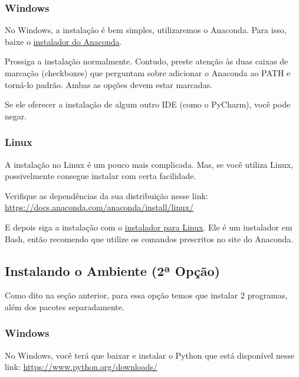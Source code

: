 \documentclass[a4paper, 11pt, brazilian]{article}
\begin{document}
\hypertarget{windows}{%
\subsubsection{Windows}\label{windows}}

No Windows, a instalação é bem simples, utilizaremos o Anaconda. Para
isso, baixe o
\href{https://www.anaconda.com/download/\#windows}{instalador do
Anaconda}.

Prossiga a instalação normalmente. Contudo, preste atenção às duas
caixas de marcação (checkboxes) que perguntam sobre adicionar o Anaconda
ao PATH e torná-lo padrão. Ambas as opções devem estar marcadas.

Se ele oferecer a instalação de algum outro IDE (como o PyCharm), você
pode negar.

\hypertarget{linux}{%
\subsubsection{Linux}\label{linux}}

A instalação no Linux é um pouco mais complicada. Mas, se você utiliza
Linux, possivelmente consegue instalar com certa facilidade.

Verifique as dependências da sua distribuição nesse link:
\url{https://docs.anaconda.com/anaconda/install/linux/}

E depois siga a instalação com o
\href{https://www.anaconda.com/download/\#linux}{instalador para Linux}.
Ele é um instalador em Bash, então recomendo que utilize os comandos
prescritos no site do Anaconda.

\hypertarget{instalando-o-ambiente-2uxaa-opuxe7uxe3o}{%
\subsection{Instalando o Ambiente (2ª
Opção)}\label{instalando-o-ambiente-2uxaa-opuxe7uxe3o}}

Como dito na seção anterior, para essa opção temos que instalar 2
programas, além dos pacotes separadamente.

\hypertarget{windows-1}{%
\subsubsection{Windows}\label{windows-1}}

No Windows, você terá que baixar e instalar o Python que está disponível
nesse link: \url{https://www.python.org/downloads/}
\end{document}
